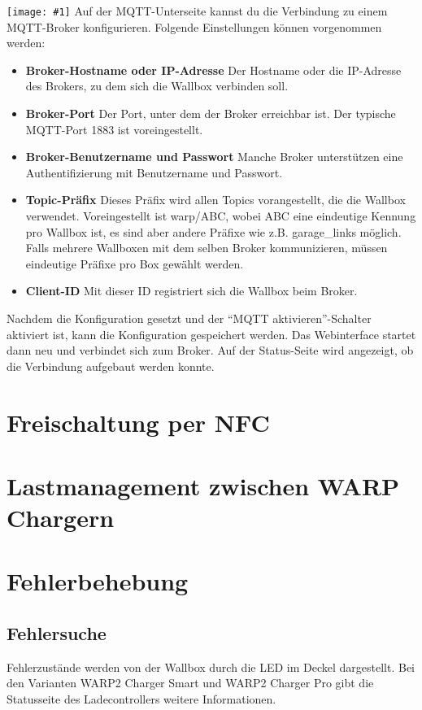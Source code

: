 \documentclass[a4paper,10pt]{article}
\newcommand{\gfx}[1]{\texttt{[image: \#1]}}
\begin{document}
\begin{multicols*}{2}
	\gfx{./img_warp2/resized/web_mqtt}
	Auf der MQTT-Unterseite kannst du die Verbindung zu einem MQTT-Broker konfigurieren. Folgende Einstellungen können vorgenommen werden:
	\begin{itemize}
		\item \textbf{Broker-Hostname oder IP-Adresse} Der Hostname oder die IP-Adresse des Brokers, zu dem sich die Wallbox verbinden soll.
		\item \textbf{Broker-Port} Der Port, unter dem der Broker erreichbar ist. Der typische MQTT-Port 1883 ist voreingestellt.
		\item \textbf{Broker-Benutzername und Passwort} Manche Broker unterstützen eine Authentifizierung mit Benutzername und Passwort.
		\item \textbf{Topic-Präfix} Dieses Präfix wird allen Topics vorangestellt, die die Wallbox verwendet.
		      Voreingestellt ist warp/ABC, wobei ABC eine eindeutige Kennung pro Wallbox ist,
		      es sind aber andere Präfixe wie z.B. garage\_links möglich.
		      Falls mehrere Wallboxen mit dem selben Broker kommunizieren,
		      müssen eindeutige Präfixe pro Box gewählt werden.
		\item \textbf{Client-ID} Mit dieser ID registriert sich die Wallbox beim Broker.
	\end{itemize} 
	Nachdem die Konfiguration gesetzt und der \enquote{MQTT aktivieren}-Schalter aktiviert ist, kann die Konfiguration gespeichert werden.
	Das Webinterface startet dann neu und verbindet sich zum Broker.
	Auf der Status-Seite wird angezeigt, ob die Verbindung aufgebaut werden konnte.

	\section{Freischaltung per NFC}
	\blindtext

	\section{Lastmanagement zwischen WARP Chargern}
	\Blindtext

	\newpage \section{Fehlerbehebung}\label{fehlerbehebung} \subsection{Fehlersuche}
	Fehlerzustände werden von der Wallbox durch die LED im Deckel
	dargestellt. Bei den Varianten WARP2 Charger Smart und WARP2 Charger Pro gibt die Statusseite des Ladecontrollers
	weitere Informationen.


\end{multicols*}
\end{document}
